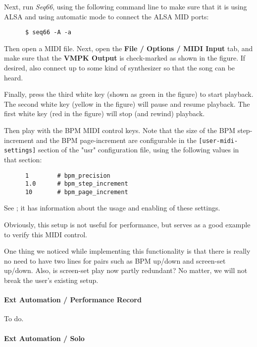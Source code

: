    Next, run \textsl{Seq66}, using the following command line to make
   sure that it is using ALSA and using automatic mode to connect the ALSA MID
   ports:

   \begin{verbatim}
      $ seq66 -A -a
   \end{verbatim}
   
   Then open a MIDI file.  Next,
   open the \textbf{File / Options / MIDI Input} tab, and make sure that
   the \textbf{VMPK Output} is check-marked as shown in the figure.
   If desired, also connect up to some kind of synthesizer so that the song can
   be heard.

   Finally, press the third white key (shown as green in the figure) to start
   playback.  The second white key (yellow in the figure) will pause and resume
   playback.  The first white key (red in the figure) will stop (and rewind)
   playback.

   Then play with the BPM MIDI control keys.  Note that the size of the
   BPM step-increment and the BPM page-increment are configurable in the
   \texttt{[user-midi-settings]} section of the "usr" configuration file,
   using the following values in that section:

   \begin{verbatim}
      1        # bpm_precision
      1.0      # bpm_step_increment
      10       # bpm_page_increment
   \end{verbatim}

   See ; it has
   information about the usage and enabling of these settings.

   Obviously, this setup is not useful for performance, but serves as a good
   example to verify this MIDI control.

   One thing we noticed while implementing this functionality is that there
   is really no need to have two lines for pairs such as BPM up/down and
   screen-set up/down.  Also, is screen-set play now partly redundant?
   No matter, we will not break the user's existing setup.

\paragraph{Ext Automation / Performance Record}
\label{paragraph:rc_file_midi_ctrl_ex_precord}

   To do.

\paragraph{Ext Automation / Solo}
\label{paragraph:rc_file_midi_ctrl_ex_solo}

